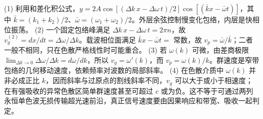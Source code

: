 (1) 利用和差化积公式，\(y=2A\cos[(\Delta k\,x-\Delta\omega\,t)/2]\cos[(\bar kx-\bar\omega t)]\)，其中 \(\bar k=(k_1+k_2)/2\)、\(\bar\omega=(\omega_1+\omega_2)/2\)。外层余弦控制慢变化包络，内层是快相位振荡。
(2) 一个固定包络峰满足 \(\Delta k\,x-\Delta\omega\,t=2\pi n\)，故 \(v_g^{(2)}=dx/dt=\Delta\omega/\Delta k\)。载波相位面满足 \(\bar kx-\bar\omega t=\) 常数，故 \(v_p=\bar\omega/\bar k\)；二者一般不相同，只在色散严格线性时可能重合。
(3) 若 \(\omega(k)\) 可微，由差商极限 \(\lim_{\Delta k\to0}\Delta\omega/\Delta k=d\omega/dk\)，所以 \(v_g=\omega'(k)\)，而 \(v_p=\omega(k)/k\)。群速度是窄带包络的几何移动速度，依赖频率对波数的局部斜率。
(4) 在色散介质中 \(\omega(k)\) 并非必成正比 \(k\)，因而斜率与过原点的割线斜率不同，\(v_g\) 可以大于或小于相速度；在有强吸收的异常色散区简单群速度甚至可超过 \(c\) 或为负。这不等于可通过两列永恒单色波无损传输超光速前沿，真正信号速度要由因果响应和带宽、吸收一起判定。
